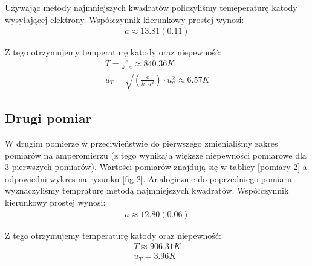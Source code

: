 \documentclass[a4paper]{article}
\newlength{\du}
\begin{document}
Używając metody najmniejszych kwadratów policzyliśmy temeperaturę katody wysyłającej elektrony. Współczynnik kierunkowy prostej wynosi:
\begin{align*}
a \approx 13.81 (0.11)
\end{align*}

Z tego otrzymujemy temperaturę katody oraz niepewność:
\begin{align*}
T = \frac{e}{k \cdot a} \approx 840.36 K \\
u_{T} = \sqrt{(\frac{e}{k \cdot a^2}) \cdot u_{a}^2} \approx 6.57 K
\end{align*}





\subsection{Drugi pomiar}
W drugim pomierze w przeciwieństwie do pierwszego zmienialiśmy zakres pomiarów na amperomierzu
(z tego wynikają większe niepewności pomiarowe dla 3 pierwszych pomiarów).
Wartości pomiarów znajdują się w tablicy \ref{pomiary-2} a odpowiedni wykres na rysunku \ref{fig-2}.
Analogicznie do poprzedniego pomiaru wyznaczyliśmy tempraturę metodą najmniejszych kwadratów.
Współczynnik kierunkowy prostej wynosi:
\begin{align*}
a \approx 12.80 (0.06)
\end{align*}

Z tego otrzymujemy temperaturę katody oraz niepewność:
\begin{align*}
T \approx 906.31 K \\
u_{T} = 3.96 K
\end{align*}
\end{document}
